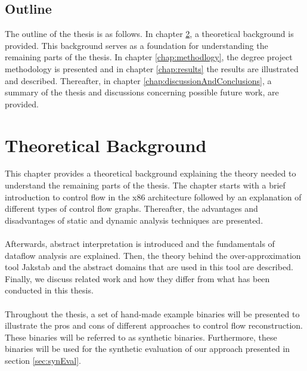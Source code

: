 \documentclass{kththesis}
\newcommand{\fbcomment}[1]{{#1}}
\renewcommand{\fbcomment}[1]{}
\begin{document}
\section{Outline}
\fbcomment{\color{red}Goal: Introduce the outline of the report (Will probably be a bit more specific in the final version of the report)}
The outline of the thesis is as follows. In chapter \ref{chap:background}, a theoretical background is provided. This background serves as a foundation for understanding the remaining parts of the thesis. In chapter \ref{chap:methodlogy}, the degree project methodology is presented and in chapter \ref{chap:results} the results are illustrated and described. Thereafter, in chapter \ref{chap:discussionAndConclusions}, a summary of the thesis and discussions concerning possible future work, are provided.
 
\chapter{Theoretical Background}\label{chap:background}
\fbcomment{\color{red}Goal: Provide enough background information to understand the concepts of the thesis and give the thesis context.}
This chapter provides a theoretical background explaining the theory needed to understand the remaining parts of the thesis. The chapter starts with a brief introduction to control flow in the x86 architecture followed by an explanation of different types of control flow graphs. Thereafter, the advantages and disadvantages of static and dynamic analysis techniques are presented. 
\\ \\
Afterwards, abstract interpretation is introduced and the fundamentals of dataflow analysis are explained. Then, the theory behind the over-approximation tool Jakstab and the abstract domains that are used in this tool are described. Finally, we discuss related work and how they differ from what has been conducted in this thesis.
\\ \\
Throughout the thesis, a set of hand-made example binaries will be presented to illustrate the pros and cons of different approaches to control flow reconstruction. These binaries will be referred to as synthetic binaries. Furthermore, these binaries will be used for the synthetic evaluation of our approach presented in section \ref{sec:synEval}.
\end{document}
